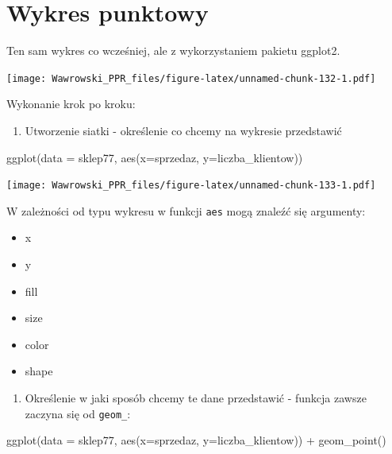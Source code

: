 \documentclass[
]{book}
\newenvironment{Shaded}{\begin{snugshade}}{\end{snugshade}}
\newcommand{\AttributeTok}[1]{\textcolor[rgb]{0.77,0.63,0.00}{#1}}
\newcommand{\FunctionTok}[1]{\textcolor[rgb]{0.00,0.00,0.00}{#1}}
\newcommand{\NormalTok}[1]{#1}
\newcommand{\SpecialCharTok}[1]{\textcolor[rgb]{0.00,0.00,0.00}{#1}}
\providecommand{\tightlist}{%
  \setlength{\itemsep}{0pt}\setlength{\parskip}{0pt}}
\begin{document}
\hypertarget{wykres-punktowy}{%
\section{Wykres punktowy}\label{wykres-punktowy}}

Ten sam wykres co wcześniej, ale z wykorzystaniem pakietu ggplot2.

\texttt{[image: Wawrowski\_PPR\_files/figure-latex/unnamed-chunk-132-1.pdf]}

Wykonanie krok po kroku:

\begin{enumerate}
\def\labelenumi{\arabic{enumi}.}
\tightlist
\item
  Utworzenie siatki - określenie co chcemy na wykresie przedstawić
\end{enumerate}

\begin{Shaded}
\begin{Highlighting}[]
\FunctionTok{ggplot}\NormalTok{(}\AttributeTok{data =}\NormalTok{ sklep77, }\FunctionTok{aes}\NormalTok{(}\AttributeTok{x=}\NormalTok{sprzedaz, }\AttributeTok{y=}\NormalTok{liczba\_klientow))}
\end{Highlighting}
\end{Shaded}

\texttt{[image: Wawrowski\_PPR\_files/figure-latex/unnamed-chunk-133-1.pdf]}

W zależności od typu wykresu w funkcji \texttt{aes} mogą znaleźć się argumenty:

\begin{itemize}
\tightlist
\item
  x
\item
  y
\item
  fill
\item
  size
\item
  color
\item
  shape
\end{itemize}

\begin{enumerate}
\def\labelenumi{\arabic{enumi}.}
\setcounter{enumi}{1}
\tightlist
\item
  Określenie w jaki sposób chcemy te dane przedstawić - funkcja zawsze zaczyna się od \texttt{geom\_}:
\end{enumerate}

\begin{Shaded}
\begin{Highlighting}[]
\FunctionTok{ggplot}\NormalTok{(}\AttributeTok{data =}\NormalTok{ sklep77, }\FunctionTok{aes}\NormalTok{(}\AttributeTok{x=}\NormalTok{sprzedaz, }\AttributeTok{y=}\NormalTok{liczba\_klientow)) }\SpecialCharTok{+}
  \FunctionTok{geom\_point}\NormalTok{()}
\end{Highlighting}
\end{Shaded}
\end{document}
